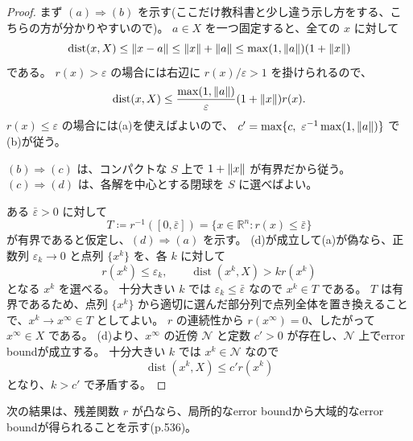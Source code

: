 \documentclass[12pt,dvipdfmx]{article}
\theoremstyle{plain}
\begin{document}
\begin{proof}
    まず $(a) \Rightarrow (b)$ を示す(ここだけ教科書と少し違う示し方をする、こちらの方が分かりやすいので)。
    $a \in X$ を一つ固定すると、全ての $x$ に対して
    \begin{equation*}
        \operatorname{dist}(x, X) \leq \norm{x - a}
        \leq \norm{x} + \norm{a}
        \leq \max(1, \norm{a})(1 + \norm{x})
    \end{equation*}
    である。
    $r(x) > \varepsilon$ の場合には右辺に $r(x)/\varepsilon > 1$ を掛けられるので、
    \begin{equation*}
        \operatorname{dist}(x, X)
        \leq \frac{\max(1, \norm{a})}{\varepsilon}(1 + \norm{x}) r(x).
    \end{equation*}
    $r(x) \leq \varepsilon$ の場合には(a)を使えばよいので、
    $c' = \max\{c,\ \varepsilon^{-1}\max(1, \norm{a})\}$ で(b)が従う。

    $(b) \Rightarrow (c)$ は、コンパクトな $S$ 上で $1 + \norm{x}$ が有界だから従う。
    $(c) \Rightarrow (d)$ は、各解を中心とする閉球を $S$ に選べばよい。

    ある $\bar\varepsilon > 0$ に対して
    \begin{equation*}
        T \coloneqq r^{-1}([0, \bar\varepsilon])
        = \{x \in \mathbb{R}^n : r(x) \leq \bar\varepsilon\}
    \end{equation*}
    が有界であると仮定し、$(d) \Rightarrow (a)$ を示す。
    (d)が成立して(a)が偽なら、正数列 $\varepsilon_k \to 0$ と点列 $\{x^k\}$ を、各 $k$ に対して
    \begin{equation*}
        r(x^k) \leq \varepsilon_k,
        \qquad \operatorname{dist}(x^k, X) > k r(x^k)
    \end{equation*}
    となる $x^k$ を選べる。
    十分大きい $k$ では $\varepsilon_k \leq \bar\varepsilon$ なので $x^k \in T$ である。
    $T$ は有界であるため、点列 $\{x^k\}$ から適切に選んだ部分列で点列全体を置き換えることで、$x^k \to x^\infty \in T$ としてよい。
    $r$ の連続性から $r(x^\infty) = 0$、したがって $x^\infty \in X$ である。
    (d)より、$x^\infty$ の近傍 $\mathcal{N}$ と定数 $c' > 0$ が存在し、$\mathcal{N}$ 上でerror boundが成立する。
    十分大きい $k$ では $x^k \in \mathcal{N}$ なので
    \begin{equation*}
        \operatorname{dist}(x^k, X) \leq c' r(x^k)
    \end{equation*}
    となり、$k > c'$ で矛盾する。
\end{proof}

次の結果は、残差関数 $r$ が凸なら、局所的なerror boundから大域的なerror boundが得られることを示す(p.536)。
\end{document}
